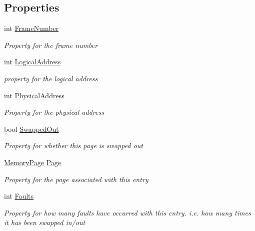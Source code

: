 \subsection*{Properties}
\begin{DoxyCompactItemize}
\item 
int \hyperlink{class_c_p_u___o_s___simulator_1_1_memory_1_1_page_table_entry_a4c1fb37bb101546867d77a4f781ba51d}{Frame\+Number}
\begin{DoxyCompactList}\small\item\em Property for the frame number \end{DoxyCompactList}\item 
int \hyperlink{class_c_p_u___o_s___simulator_1_1_memory_1_1_page_table_entry_a22a89428526ff3d2c8247a14eba38242}{Logical\+Address}
\begin{DoxyCompactList}\small\item\em property for the logical address \end{DoxyCompactList}\item 
int \hyperlink{class_c_p_u___o_s___simulator_1_1_memory_1_1_page_table_entry_ab52b7572557f81a63006101b4b348f8f}{Physical\+Address}
\begin{DoxyCompactList}\small\item\em Property for the physical address \end{DoxyCompactList}\item 
bool \hyperlink{class_c_p_u___o_s___simulator_1_1_memory_1_1_page_table_entry_a334eb63f388b19d1cf6907970f29e204}{Swapped\+Out}
\begin{DoxyCompactList}\small\item\em Property for whether this page is swapped out \end{DoxyCompactList}\item 
\hyperlink{class_c_p_u___o_s___simulator_1_1_memory_1_1_memory_page}{Memory\+Page} \hyperlink{class_c_p_u___o_s___simulator_1_1_memory_1_1_page_table_entry_aa592969e0204f85ad96a9ab76ca7f50d}{Page}
\begin{DoxyCompactList}\small\item\em Property for the page associated with this entry \end{DoxyCompactList}\item 
int \hyperlink{class_c_p_u___o_s___simulator_1_1_memory_1_1_page_table_entry_a2a8e194e6452298fe5b0a0c6405bf57b}{Faults}
\begin{DoxyCompactList}\small\item\em Property for how many faults have occurred with this entry. i.\+e. how many times it has been swapped in/out \end{DoxyCompactList}\end{DoxyCompactItemize}
